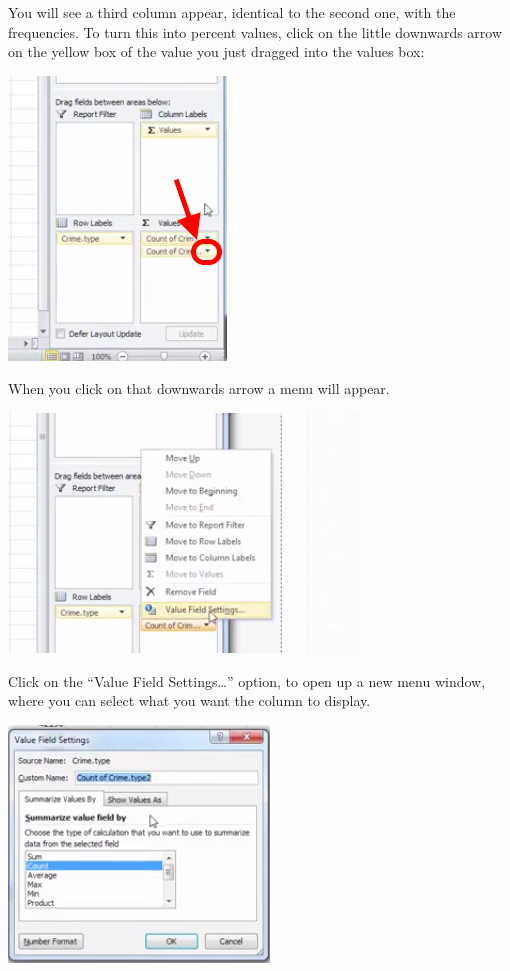 \documentclass[]{book}
\theoremstyle{definition}
\theoremstyle{definition}
\theoremstyle{definition}
\theoremstyle{remark}
\begin{document}
You will see a third column appear, identical to the second one, with
the frequencies. To turn this into percent values, click on the little
downwards arrow on the yellow box of the value you just dragged into the
values box:

\includegraphics{imgs/down_arrow_perc.png}

When you click on that downwards arrow a menu will appear.

\includegraphics{imgs/value_field_settings.png}

Click on the ``Value Field Settings\ldots{}'' option, to open up a new
menu window, where you can select what you want the column to display.

\includegraphics{imgs/vfs_menu.png}
\end{document}
